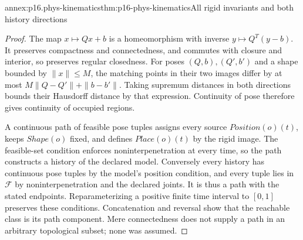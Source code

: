 \begin{annexitem}{annex:p16.phys-kinematics}{thm:p16-phys-kinematics}{All rigid invariants and both history directions}
\begin{proof}
The map \(x\mapsto Qx+b\) is a homeomorphism with inverse
\(y\mapsto Q^T(y-b)\). It preserves compactness and connectedness,
and commutes with closure and interior, so preserves regular closedness.
For poses \((Q,b),(Q',b')\) and a shape bounded by \(\|x\|\le M\),
the matching points in their two images differ by at most
\(M\|Q-Q'\|+\|b-b'\|\). Taking supremum distances in both
directions bounds their Hausdorff distance by that expression. Continuity
of pose therefore gives continuity of occupied regions.

A continuous path of feasible pose tuples assigns every source
\(Position(o)(t)\), keeps \(Shape(o)\) fixed, and defines
\(Place(o)(t)\) by the rigid image. The feasible-set condition enforces
noninterpenetration at every time, so the path constructs a history of the
declared model. Conversely every history has continuous pose tuples by
the model's position condition, and every tuple lies in \(\mathcal F\)
by noninterpenetration and the declared joints. It is thus a path with
the stated endpoints. Reparameterizing a positive finite time interval
to \([0,1]\) preserves these conditions. Concatenation and reversal
show that the reachable class is its path component. Mere connectedness
does not supply a path in an arbitrary topological subset; none was assumed.
\end{proof}
\end{annexitem}

